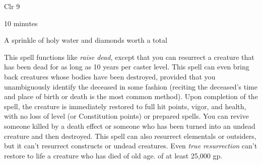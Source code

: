 
\begin{description*}
\item[Level:] Clr 9
\item[Casting Time:] 10 minutes
\item[Arcane Material Component:] A sprinkle of holy water and diamonds worth a total
\end{description*}

This spell functions like \textit{raise dead}, except that you can resurrect a
creature that has been dead for as long as 10 years per caster level. This spell
can even bring back creatures whose bodies have been destroyed, provided that you
unambiguously identify the deceased in some fashion (reciting the deceased's time
and place of birth or death is the most common method).
Upon completion of the spell, the creature is immediately restored to full hit
points, vigor, and health, with no loss of level (or Constitution points) or prepared
spells.
You can revive someone killed by a death effect or someone who has been turned
into an undead creature and then destroyed. This spell can also resurrect elementals
or outsiders, but it can't resurrect constructs or undead creatures.
Even \textit{true resurrection} can't restore to life a creature who has died of
old age.
of at least 25,000 gp.